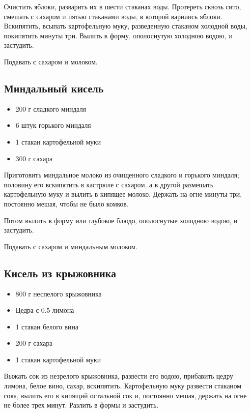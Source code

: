 Очистить яблоки, разварить их в шести стаканах воды. Протереть сквозь сито, смешать с сахаром и пятью стаканами воды, в которой варились яблоки. Вскипятить, всыпать картофельную муку, разведенную стаканом холодной воды, покипятить минуты три. Вылить в форму, ополоснутую холодною водою, и застудить.

Подавать с сахаром и молоком.

\subsection{Миндальный кисель}

\begin{itemize}
	\item 200 г сладкого миндаля 
    \item 6 штук горького миндаля 
    \item 1 стакан картофельной муки 
    \item 300 г сахара
\end{itemize}

Приготовить миндальное молоко из очищенного сладкого и горького миндаля; половину его вскипятить в кастрюле с сахаром, а в другой размешать картофельную муку и вылить в кипящее молоко. Держать на огне минуты три, постоянно мешая, чтобы не было комков.

Потом вылить в форму или глубокое блюдо, ополоснутые холодною водою, и застудить.

Подавать с сахаром и миндальным молоком.

\subsection{Кисель из крыжовника}

\begin{itemize}
	\item 800 г неспелого крыжовника 
    \item Цедра с 0.5 лимона 
    \item 1 стакан белого вина 
    \item 200 г сахара 
    \item 1 стакан картофельной муки
\end{itemize}

Выжать сок из незрелого крыжовника, развести его водою, прибавить цедру лимона, белое вино, сахар, вскипятить. Картофельную муку развести стаканом сока, вылить его в кипящий остальной сок и, постоянно мешая, держать на огне не более трех минут. Разлить в формы и застудить.

